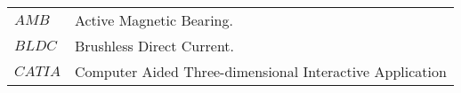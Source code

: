 
\begin{Abbreviations}
	
\begin{longtable}{m{3cm}   m{12cm}}
\(AMB\) & Active Magnetic Bearing.\\
\(BLDC\) & Brushless Direct Current.\\
\(CATIA\) & Computer Aided Three-dimensional Interactive Application\\
\end{longtable}

\end{Abbreviations}







